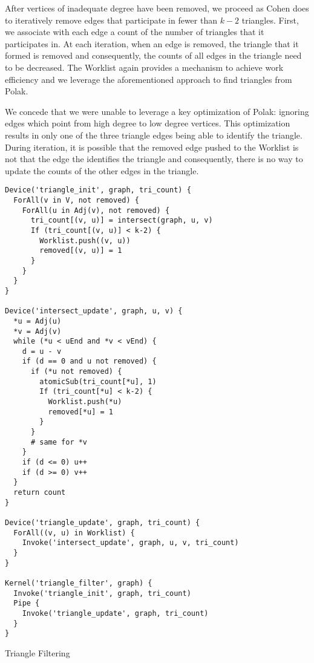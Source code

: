 \documentclass[conference]{IEEEtran}
\begin{document}
After vertices of inadequate degree have been removed, we proceed as Cohen does to iteratively remove edges that participate in fewer than $k-2$ triangles. First, we associate with each edge a count of the number of triangles that it participates in. At each iteration, when an edge is removed, the triangle that it formed is removed and consequently, the counts of all edges in the triangle need to be decreased. The Worklist again provides a mechanism to achieve work efficiency and we leverage the aforementioned approach to find triangles from Polak.

We concede that we were unable to leverage a key optimization of Polak: ignoring edges which point from high degree to low degree vertices. This optimization results in only one of the three triangle edges being able to identify the triangle. During iteration, it is possible that the removed edge pushed to the Worklist is not that the edge the identifies the triangle and consequently, there is no way to update the counts of the other edges in the triangle.

\begin{listing}
\begin{verbatim}
Device('triangle_init', graph, tri_count) {
  ForAll(v in V, not removed) {
    ForAll(u in Adj(v), not removed) {
      tri_count[(v, u)] = intersect(graph, u, v)
      If (tri_count[(v, u)] < k-2) {
        Worklist.push((v, u))
        removed[(v, u)] = 1
      }
    }
  }
}

Device('intersect_update', graph, u, v) {
  *u = Adj(u)
  *v = Adj(v)
  while (*u < uEnd and *v < vEnd) {
    d = u - v
    if (d == 0 and u not removed) {
      if (*u not removed) {
        atomicSub(tri_count[*u], 1)
        If (tri_count[*u] < k-2) {
          Worklist.push(*u)
          removed[*u] = 1
        }
      }
      # same for *v
    }
    if (d <= 0) u++
    if (d >= 0) v++
  }
  return count
}

Device('triangle_update', graph, tri_count) {
  ForAll((v, u) in Worklist) {
    Invoke('intersect_update', graph, u, v, tri_count)
  }
}

Kernel('triangle_filter', graph) {
  Invoke('triangle_init', graph, tri_count)
  Pipe {
    Invoke('triangle_update', graph, tri_count)
  }
}
\end{verbatim}
\caption{Triangle Filtering}
\label{l:tri_filter}
\end{listing}

\end{document}
